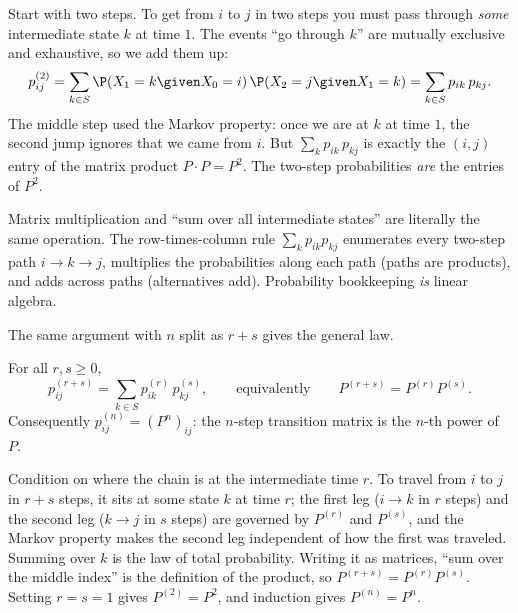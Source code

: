 Start with two steps. To get from $i$ to $j$ in two steps you must pass through \emph{some}
intermediate state $k$ at time $1$. The events ``go through $k$'' are mutually exclusive and
exhaustive, so we add them up:
\[
  p_{ij}^{(2)} = \sum_{k \in S} \P(X_1 = k \given X_0 = i)\,\P(X_2 = j \given X_1 = k)
              = \sum_{k \in S} p_{ik}\, p_{kj}.
\]
The middle step used the Markov property: once we are at $k$ at time $1$, the second jump
ignores that we came from $i$. But $\sum_k p_{ik}\,p_{kj}$ is exactly the $(i,j)$ entry of
the matrix product $P \cdot P = P^2$. The two-step probabilities \emph{are} the entries of
$P^2$.

\begin{intuitionbox}
Matrix multiplication and ``sum over all intermediate states'' are literally the same
operation. The row-times-column rule $\sum_k p_{ik} p_{kj}$ enumerates every two-step path
$i \to k \to j$, multiplies the probabilities along each path (paths are products), and adds
across paths (alternatives add). Probability bookkeeping \emph{is} linear algebra.
\end{intuitionbox}

The same argument with $n$ split as $r + s$ gives the general law.

\begin{theorem}
\label{ch23:chapman-kolmogorov}
For all $r, s \ge 0$,
\[
  p_{ij}^{(r+s)} = \sum_{k \in S} p_{ik}^{(r)}\, p_{kj}^{(s)},
  \qquad\text{equivalently}\qquad
  P^{(r+s)} = P^{(r)} P^{(s)}.
\]
Consequently $p_{ij}^{(n)} = (P^n)_{ij}$: the $n$-step transition matrix is the $n$-th power
of $P$.
\end{theorem}

\begin{whybox}
Condition on where the chain is at the intermediate time $r$. To travel from $i$ to $j$ in
$r+s$ steps, it sits at some state $k$ at time $r$; the first leg ($i \to k$ in $r$ steps) and
the second leg ($k \to j$ in $s$ steps) are governed by $P^{(r)}$ and $P^{(s)}$, and the
Markov property makes the second leg independent of how the first was traveled. Summing over
$k$ is the law of total probability. Writing it as matrices, ``sum over the middle index'' is
the definition of the product, so $P^{(r+s)} = P^{(r)}P^{(s)}$. Setting $r=s=1$ gives
$P^{(2)} = P^2$, and induction gives $P^{(n)} = P^n$.
\end{whybox}

